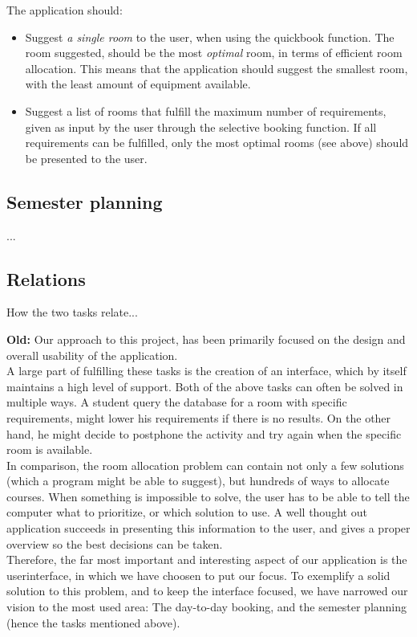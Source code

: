 The application should:

\begin{itemize}
	\item Suggest \emph{a single room} to the user, when using the quickbook function. The room suggested, should be the most \emph{optimal} room, in terms of efficient room allocation. This means that the application should suggest the smallest room, with the least amount of equipment available.
	\item Suggest a list of rooms that fulfill the maximum number of requirements, given as input by the user through the selective booking function. If all requirements can be fulfilled, only the most optimal rooms (see above) should be presented to the user.
\end{itemize}

\subsection{Semester planning}
...

\subsection{Relations}
How the two tasks relate...

\textbf{Old:}
Our approach to this project, has been primarily focused on the design and overall usability of the application. \\



A large part of fulfilling these tasks is the creation of an interface, which by itself maintains a high level of support. 
Both of the above tasks can often be solved in multiple ways. A student query the database for a room with specific requirements, might lower his requirements if there is no results. On the other hand, he might decide to postphone  the activity and try again when the specific room is available.\\
In comparison, the room allocation problem can contain not only a few solutions (which a program might be able to suggest), but hundreds of ways to allocate courses. When something is impossible to solve, the user has to be able to tell the computer what to prioritize, or which solution to use.
A well thought out application succeeds in presenting this information to the user, and gives a proper overview so the best decisions can be taken. \\
Therefore, the far most important and interesting aspect of our application is the userinterface, in which we have choosen to put our focus. To exemplify a solid solution to this problem, and to keep the interface focused, we have narrowed our vision to the most used area: The day-to-day booking, and the semester planning (hence the tasks mentioned above). \\

